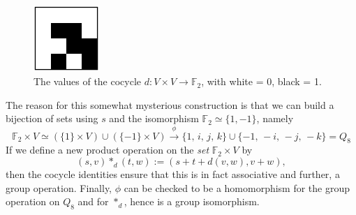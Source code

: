 \documentclass{article}
\theoremstyle{plain}
\theoremstyle{definition}
\def \FF {\mathbb{F}}
\begin{document}
\begin{figure}[!b]
\begin{center}
\includegraphics[height=2.5cm]{quaternion_cocyc} %
\end{center}
\caption{The values of the cocycle $d\colon V\times V\to \FF_2$, with white = 0, black = 1.}
\label{fig:cocycle for q8}
\end{figure}


The reason for this somewhat mysterious construction is that we can build a bijection of sets using $s$ and the isomorphism $\FF_2\simeq \{1,-1\}$, namely
\[
	\FF_2\times V \simeq \left(\{1\}\times V\right) \cup \left(\{-1\} \times V\right) \stackrel{\phi}{\longrightarrow}
	\{1,\, i,\, j,\, k\}\cup \{-1,\, -i,\, -j,\, -k\} = Q_8
\]
If we define a new product operation on the \emph{set} $\FF_2\times V$ by
\[
	(s,v)\ast_d(t,w):=(s+ t+ d(v,w),v+w),
\]
then the cocycle identities ensure that this is in fact associative and further, a group operation.
Finally, $\phi$ can be checked to be a homomorphism for the group operation on $Q_8$ and for $\ast_d$, hence is a group isomorphism.
\end{document}
